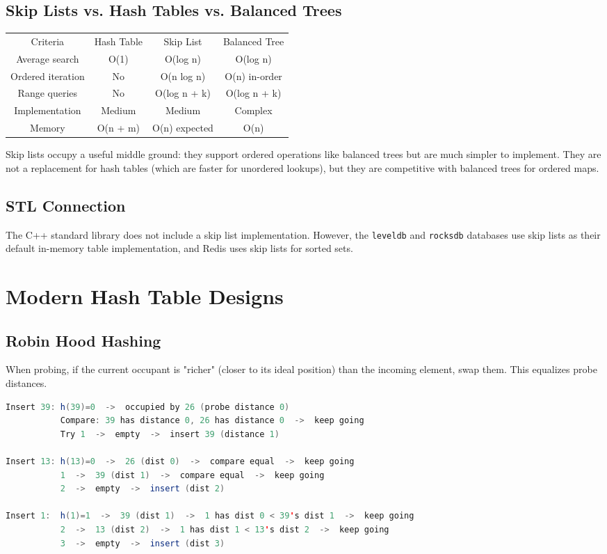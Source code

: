 \subsection{Skip Lists vs. Hash Tables vs. Balanced Trees}

\begin{center}
\begin{tabular}{cccc}
\toprule
Criteria & Hash Table & Skip List & Balanced Tree \\
Average search & O(1) & O(log n) & O(log n) \\
Ordered iteration & No & O(n log n) & O(n) in-order \\
Range queries & No & O(log n + k) & O(log n + k) \\
Implementation & Medium & Medium & Complex \\
Memory & O(n + m) & O(n) expected & O(n) \\

\bottomrule
\end{tabular}
\end{center}
Skip lists occupy a useful middle ground: they support ordered operations like balanced trees but are much simpler to implement. They are not a replacement for hash tables (which are faster for unordered lookups), but they are competitive with balanced trees for ordered maps.

\subsection{STL Connection}

The C++ standard library does not include a skip list implementation. However, the \texttt{leveldb} and \texttt{rocksdb} databases use skip lists as their default in-memory table implementation, and Redis uses skip lists for sorted sets.

\section{Modern Hash Table Designs}

\subsection{Robin Hood Hashing}

When probing, if the current occupant is "richer" (closer to its ideal position) than the incoming element, swap them. This equalizes probe distances.

\begin{lstlisting}[language=Java]
Insert 39: h(39)=0  ->  occupied by 26 (probe distance 0)
           Compare: 39 has distance 0, 26 has distance 0  ->  keep going
           Try 1  ->  empty  ->  insert 39 (distance 1)

Insert 13: h(13)=0  ->  26 (dist 0)  ->  compare equal  ->  keep going
           1  ->  39 (dist 1)  ->  compare equal  ->  keep going
           2  ->  empty  ->  insert (dist 2)

Insert 1:  h(1)=1  ->  39 (dist 1)  ->  1 has dist 0 < 39's dist 1  ->  keep going
           2  ->  13 (dist 2)  ->  1 has dist 1 < 13's dist 2  ->  keep going
           3  ->  empty  ->  insert (dist 3)
\end{lstlisting}

